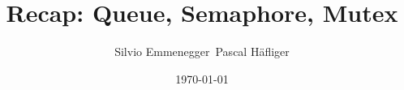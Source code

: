 \title{Recap: Queue, Semaphore, Mutex}  
\author{Silvio Emmenegger\, Pascal H\"afliger}
\date{\today} 

\begin{frame}
\titlepage
\end{frame} 

